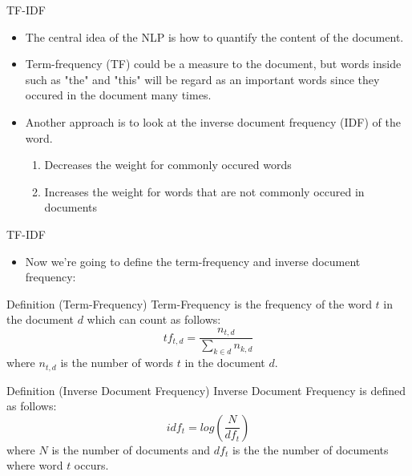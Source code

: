 \begin{frame}[fragile]{TF-IDF}

    \begin{itemize}
        \item The central idea of the NLP is how to quantify the content of the document.
        \item Term-frequency (TF) could be a measure to the document, but words inside such as "the" and "this" will be regard as an important words since they occured in the document many times.
        \item Another approach is to look at the inverse document frequency (IDF) of the word.
              \begin{enumerate}
                  \item Decreases the weight for commonly occured words
                  \item Increases the weight for words that are not commonly occured in documents
              \end{enumerate}
    \end{itemize}

\end{frame}

\begin{frame}[fragile]{TF-IDF}

    \begin{itemize}
        \item Now we're going to define the term-frequency and inverse document frequency:
    \end{itemize}
    \begin{block}{Definition (Term-Frequency)}
        Term-Frequency is the frequency of the word $t$ in the document $d$ which can count as follows:
        $$tf_{t,d} = \frac{n_{t,d}}{\sum_{k \in d} n_{k,d}}$$
        where $n_{t,d}$ is the number of words $t$ in the document $d$.
    \end{block}
    \begin{block}{Definition (Inverse Document Frequency)}
        Inverse Document Frequency is defined as follows:
        $$idf_{t} = log(\frac{N}{df_{t}})$$
        where $N$ is the number of documents and $df_{t}$ is the the number of documents where word $t$ occurs.
    \end{block}

\end{frame}

